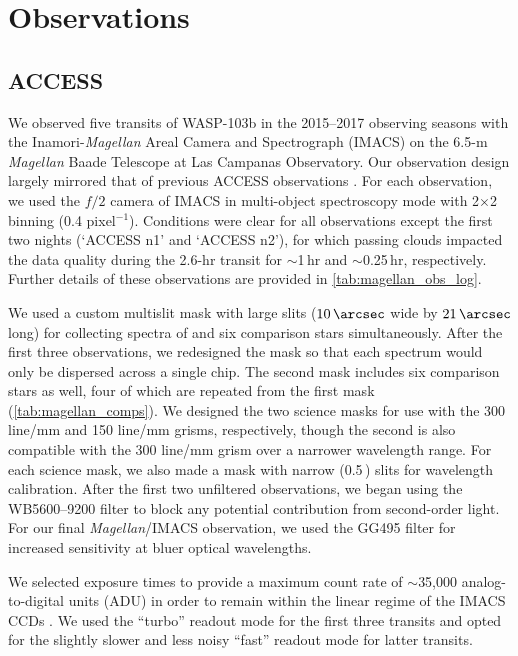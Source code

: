 \documentclass[twocolumn]{aastex63}
\newcommand{\Magellan}{\textit{Magellan}}
\begin{document}
\section{Observations}
\label{sec:observations}

\subsection{ACCESS}
\label{sec:obs_ACCESS}

We observed five transits of WASP-103b in the 2015--2017 observing seasons with the Inamori-\Magellan{} Areal Camera and Spectrograph (IMACS) \citep{Dressler2011} on the 6.5-m \Magellan{} Baade Telescope at Las Campanas Observatory.
Our observation design largely mirrored that of previous ACCESS observations \citep{Jordan2013, Rackham2017, Bixel2019, Espinoza2019, McGruder2020, Weaver2020,Weaver2021}.
For each observation, we used the $f/2$ camera of IMACS in multi-object spectroscopy mode with 2$\times$2 binning (0.4\,\arcsec\,pixel$^{-1}$).
Conditions were clear for all observations except the first two nights (`ACCESS n1' and `ACCESS n2'), for which passing clouds impacted the data quality during the 2.6-hr transit for $\sim$1\,hr and ${\sim}$0.25\,hr, respectively.
Further details of these observations are provided in \autoref{tab:magellan_obs_log}.

We used a custom multislit mask with large slits ($10\,\arcsec$ wide by $21\,\arcsec$ long) for collecting spectra of  and six comparison stars simultaneously.
After the first three observations, we redesigned the mask so that each spectrum would only be dispersed across a single chip.
The second mask includes six comparison stars as well, four of which are repeated from the first mask (\autoref{tab:magellan_comps}).
We designed the two science masks for use with the 300 line/mm and 150 line/mm grisms, respectively, though the second is also compatible with the 300 line/mm grism over a narrower wavelength range.
For each science mask, we also made a mask with narrow (0.5\,\arcsec) slits for wavelength calibration.
After the first two unfiltered observations, we began using
the WB5600--9200 filter to block any potential contribution from second-order light.
For our final \Magellan{}/IMACS observation, we used the GG495 filter for increased sensitivity at bluer optical wavelengths.


We selected exposure times to provide a maximum count rate of $\sim$35,000 analog-to-digital units (ADU) in order to remain within the linear regime of the IMACS CCDs \citep[see Section~3.8 of][]{Bixel2019}.
We used the ``turbo'' readout mode for the first three transits and opted for the slightly slower and less noisy ``fast'' readout mode for latter transits.
\end{document}
